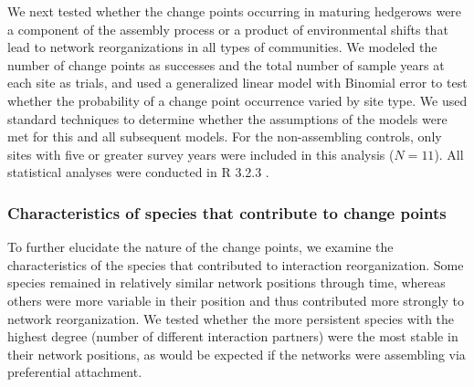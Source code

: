 \documentclass[12pt]{article}
\begin{document}
We next tested whether the change points occurring in maturing
hedgerows were a component of the assembly process or a product of
environmental shifts that lead to network reorganizations in all types
of communities. We modeled the number of change points as successes
and the total number of sample years at each site as trials, and used
a generalized linear model with Binomial error to test whether the
probability of a change point occurrence varied by site type. We used
standard techniques to determine whether the assumptions of the models
were met for this and all subsequent models. For the non-assembling
controls, only sites with five or greater survey years were included
in this analysis ($N=11$). All statistical analyses were conducted in
R 3.2.3 \citep{R}.

\subsubsection*{Characteristics of species that contribute to change
  points}

To further elucidate the nature of the change points, we examine the
characteristics of the species that contributed to interaction
reorganization. Some species remained in relatively similar network
positions through time, whereas others were more variable in their
position and thus contributed more strongly to network
reorganization. We tested whether the more persistent species with the
highest degree (number of different interaction partners) were the
most stable in their network positions, as would be expected if the
networks were assembling via preferential attachment.
\end{document}
